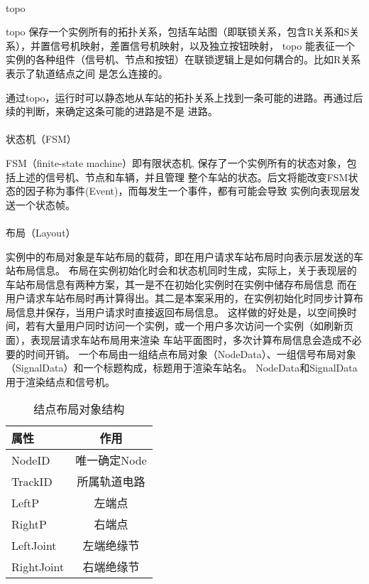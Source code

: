 \paragraph{}topo

topo 保存一个实例所有的拓扑关系，包括车站图（即联锁关系，包含R关系和S关系），并置信号机映射，差置信号机映射，以及独立按钮映射，
topo 能表征一个实例的各种组件（信号机、节点和按钮）在联锁逻辑上是如何耦合的。比如R关系表示了轨道结点之间
是怎么连接的。

通过topo，运行时可以静态地从车站的拓扑关系上找到一条可能的进路。再通过后续的判断，来确定这条可能的进路是不是
进路。

\paragraph{}状态机（FSM）

FSM（finite-state machine）即有限状态机, 保存了一个实例所有的状态对象，包括上述的信号机、节点和车辆，并且管理
整个车站的状态。后文将能改变FSM状态的因子称为事件(Event)，而每发生一个事件，都有可能会导致
实例向表现层发送一个状态帧。

\paragraph{}布局（Layout）

实例中的布局对象是车站布局的载荷，即在用户请求车站布局时向表示层发送的车站布局信息。
布局在实例初始化时会和状态机同时生成，实际上，关于表现层的车站布局信息有两种方案，其一是不在初始化实例时在实例中储存布局信息
而在用户请求车站布局时再计算得出。其二是本案采用的，在实例初始化时同步计算布局信息并保存，当用户请求时直接返回布局信息。
这样做的好处是，以空间换时间，若有大量用户同时访问一个实例，或一个用户多次访问一个实例（如刷新页面），表现层请求车站布局用来渲染
车站平面图时，多次计算布局信息会造成不必要的时间开销。
一个布局由一组结点布局对象（NodeData）、一组信号布局对象（SignalData）和一个标题构成，标题用于渲染车站名。
NodeData和SignalData 用于渲染结点和信号机。

\begin{table}[htpb!]
    \centering
    \caption{\label{node_data}结点布局对象结构}
    \begin{threeparttable}
        \begin{tabular}{lc}
            \toprule
            属性       & 作用         \\
            \midrule
            NodeID     & 唯一确定Node \\
            TrackID    & 所属轨道电路 \\
            LeftP      & 左端点       \\
            RightP     & 右端点       \\
            LeftJoint  & 左端绝缘节   \\
            RightJoint & 右端绝缘节   \\
            \bottomrule
        \end{tabular}
    \end{threeparttable}
\end{table}

